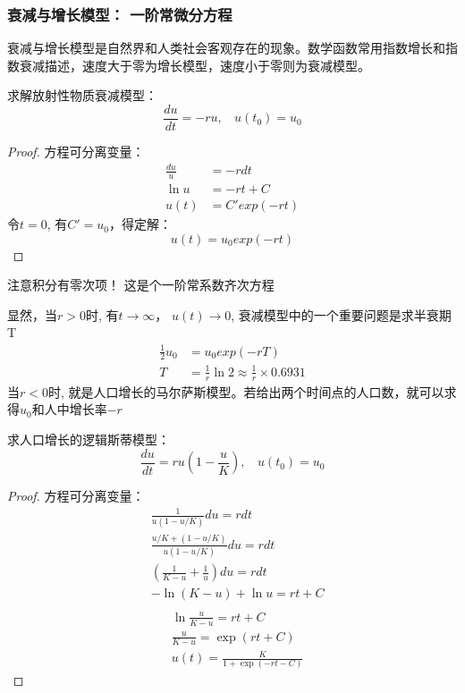 \subsubsection{衰减与增长模型： 一阶常微分方程}
衰减与增长模型是自然界和人类社会客观存在的现象。数学函数常用指数增长和指数衰减描述，速度大于零为增长模型，速度小于零则为衰减模型。

\begin{example} 
求解放射性物质衰减模型：
\begin{equation*}
\frac{du}{dt}	= - ru, ~~~~ u(t_0) = u_0
\end{equation*}
\begin{proof} {}方程可分离变量：
\begin{align*}
\frac{du}{u} &= - rdt\\
\ln u &=-rt+C\\
u(t)      &=C'exp(-rt)	
\end{align*}
令$t=0$, 有$C'=u_0$，得定解：
\begin{equation*}
u(t)	= u_0 exp(-rt)
\end{equation*}
\end{proof}
\end{example}

\begin{note}
	注意积分有零次项！ 这是个一阶常系数齐次方程
\end{note}
显然，当$r>0$时, 有$t\rightarrow \infty$， $u(t)\rightarrow 0$,  衰减模型中的一个重要问题是求半衰期 T
\begin{align*}
\frac{1}{2}u_0 &= u_0 exp(-rT)\\
T &=\frac{1}{r} \ln 2  \approx \frac{1}{r} \times 0.6931	
\end{align*}
当$r<0$时, 就是人口增长的马尔萨斯模型。若给出两个时间点的人口数，就可以求得$u_0$和人中增长率$-r$\\

\begin{example} %
求人口增长的逻辑斯蒂模型：
\begin{equation*}
	\frac{du}{dt}	=  ru (1-\frac{u}{K}), ~~~~ u(t_0) = u_0
\end{equation*}
\begin{proof} 方程可分离变量：\\
\begin{align*}
	&\frac{1}{u(1-u / K)}du =r d t \\
	&\frac{u / K+(1-u / K)}{u(1-u / K)} d u =r d t	\\
	&(\frac{1}{K-u}+\frac{1}{u} ) d u =r d t \\
	&-\ln (K-u)+\ln u =r t+C \\
\end{align*}
\begin{align*}	
	&\ln \frac{u}{K-u}  =r t+C\\
	&\frac{u}{K-u} =\exp (r t+C)\\
	&u(t)  =\frac{K}{1+\exp (-r t-C)}	
	\end{align*}	
\end{proof}
\end{example}

